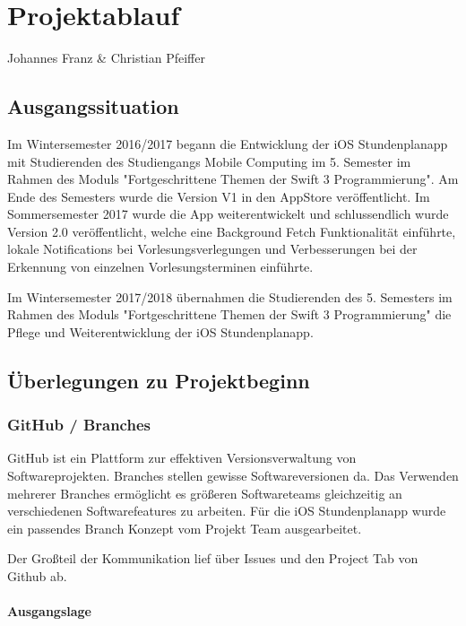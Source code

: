 \chapter{Projektablauf}
Johannes Franz \& Christian Pfeiffer

\section{Ausgangssituation}

Im Wintersemester 2016/2017 begann die Entwicklung der iOS Stundenplanapp mit Studierenden des Studiengangs Mobile Computing im 5. Semester im Rahmen des Moduls "Fortgeschrittene Themen der Swift 3 Programmierung". Am Ende des Semesters wurde die Version V1 in den AppStore veröffentlicht. Im Sommersemester 2017 wurde die App weiterentwickelt und schlussendlich wurde Version 2.0 veröffentlicht, welche eine Background Fetch Funktionalität einführte, lokale Notifications bei Vorlesungsverlegungen und Verbesserungen bei der Erkennung von einzelnen Vorlesungsterminen einführte.

Im Wintersemester 2017/2018 übernahmen die Studierenden des 5. Semesters im Rahmen des Moduls "Fortgeschrittene Themen der Swift 3 Programmierung" die Pflege und Weiterentwicklung der iOS Stundenplanapp.


\newpage
\section{Überlegungen zu Projektbeginn}

\subsection{GitHub / Branches}
GitHub ist ein Plattform zur effektiven Versionsverwaltung von Softwareprojekten. Branches stellen gewisse Softwareversionen da. Das Verwenden mehrerer Branches ermöglicht es größeren Softwareteams gleichzeitig an verschiedenen Softwarefeatures zu arbeiten.
Für die iOS Stundenplanapp wurde ein passendes Branch Konzept vom Projekt Team ausgearbeitet.

Der Großteil der Kommunikation lief über Issues und den Project Tab von Github ab.

\subsubsection{Ausgangslage}

